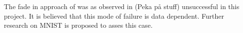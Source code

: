 The fade in approach of \textcite{karras2017progressive} was as observed in (Peka på stuff) unsuccessful in this project. It is believed that this mode of failure is data dependent. Further research on MNIST is proposed to asses this case.



